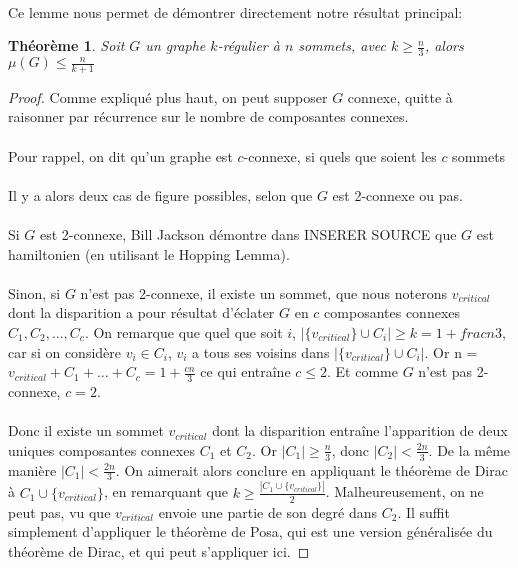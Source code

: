 \documentclass[a4paper]{article}
\newtheorem{theorem}{Théorème}
\theoremstyle{definition}
\theoremstyle{remark}
\begin{document}
\paragraph{}
Ce lemme nous permet de démontrer directement notre résultat principal:
\begin{theorem}
Soit $G$ un graphe $k$-régulier à $n$ sommets, avec $k \geq \frac{n}{3}$,
alors $\mu(G)\leq \frac{n}{k+1}$
\end{theorem}
\begin{proof}
Comme expliqué plus haut, on peut supposer $G$ connexe, quitte à 
raisonner par récurrence sur le nombre de composantes connexes.

\paragraph{}
Pour rappel, on dit qu'un graphe est $c$-connexe, si quels que soient les
$c$ sommets 
\paragraph{}
Il y a alors deux cas de figure possibles, selon que $G$ est 2-connexe
ou pas.

\paragraph{}
Si $G$ est 2-connexe, Bill Jackson démontre dans INSERER SOURCE que $G$ 
est hamiltonien (en utilisant le Hopping Lemma).


\paragraph{}
Sinon, si $G$ n'est pas 2-connexe, il existe un sommet, que nous noterons
$v_{critical}$ dont la disparition a pour résultat d'éclater $G$ en $c$ 
composantes connexes $C_{1}, C_{2}, ..., C_{c}$. On remarque que quel 
que soit $i$, $|\{v_{critical}\} \cup C_{i}| \geq k = 1+frac{n}{3}$, car si on considère $v_{i} \in C_{i}$, $v_{i}$ a tous ses voisins dans $|\{v_{critical}\} \cup C_{i}|$. Or n = $v_{critical} + C_{1} + ... + C_{c} = 
1 + \frac{cn}{3}$ ce qui entraîne $c \leq 2$. Et comme $G$ n'est pas 2-connexe, $c = 2$.


\paragraph{}
Donc il existe un sommet $v_{critical}$ dont la disparition entraîne
l'apparition de deux uniques composantes connexes $C_{1}$ et $C_{2}$.
Or $|C_{1}| \geq \frac{n}{3}$, donc $|C_{2}| < \frac{2n}{3}$. De la même
manière $|C_{1}| < \frac{2n}{3}$. On aimerait alors conclure en 
appliquant le théorème de Dirac à $C_{1} \cup \{v_{critical}\}$, en remarquant que $k \geq \frac{|C_{1} \cup \{v_{critical}\}|}{2}$. 
Malheureusement, on ne peut pas, vu que $v_{critical}$ envoie une partie
de son degré dans $C_{2}$. Il suffit simplement d'appliquer le théorème
de Posa, qui est une version généralisée du théorème de Dirac, et qui 
peut s'appliquer ici.



\end{proof}
\end{document}
